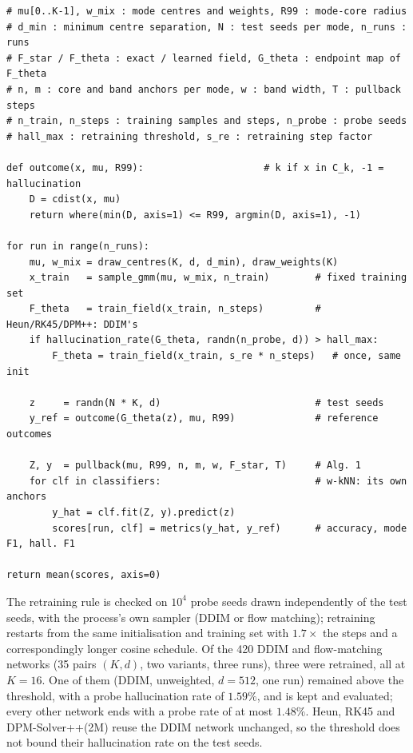 

\begin{algorithm}[htbp]
\caption{Evaluation protocol for one configuration (sampler, mixture variant, $K$, $d$, $T$, $b$).}
\label{alg:app-protocol}
\begin{lstlisting}[style=appcode]
# mu[0..K-1], w_mix : mode centres and weights, R99 : mode-core radius
# d_min : minimum centre separation, N : test seeds per mode, n_runs : runs
# F_star / F_theta : exact / learned field, G_theta : endpoint map of F_theta
# n, m : core and band anchors per mode, w : band width, T : pullback steps
# n_train, n_steps : training samples and steps, n_probe : probe seeds
# hall_max : retraining threshold, s_re : retraining step factor

def outcome(x, mu, R99):                     # k if x in C_k, -1 = hallucination
    D = cdist(x, mu)
    return where(min(D, axis=1) <= R99, argmin(D, axis=1), -1)

for run in range(n_runs):
    mu, w_mix = draw_centres(K, d, d_min), draw_weights(K)
    x_train   = sample_gmm(mu, w_mix, n_train)        # fixed training set
    F_theta   = train_field(x_train, n_steps)         # Heun/RK45/DPM++: DDIM's
    if hallucination_rate(G_theta, randn(n_probe, d)) > hall_max:
        F_theta = train_field(x_train, s_re * n_steps)   # once, same init

    z     = randn(N * K, d)                           # test seeds
    y_ref = outcome(G_theta(z), mu, R99)              # reference outcomes

    Z, y  = pullback(mu, R99, n, m, w, F_star, T)     # Alg. 1
    for clf in classifiers:                           # w-kNN: its own anchors
        y_hat = clf.fit(Z, y).predict(z)
        scores[run, clf] = metrics(y_hat, y_ref)      # accuracy, mode F1, hall. F1

return mean(scores, axis=0)
\end{lstlisting}
\end{algorithm}

The retraining rule is checked on $10^4$ probe seeds drawn independently of the test seeds, with
the process's own sampler (DDIM or flow matching); retraining restarts from the same initialisation
and training set with $1.7\times$ the steps and a correspondingly longer cosine schedule. Of the
420 DDIM and flow-matching networks (35 pairs $(K, d)$, two variants, three runs), three were
retrained, all at $K = 16$. One of them (DDIM, unweighted, $d = 512$, one run) remained above the
threshold, with a probe hallucination rate of $1.59\%$, and is kept and evaluated; every other
network ends with a probe rate of at most $1.48\%$. Heun, RK45 and DPM-Solver++(2M) reuse the DDIM
network unchanged, so the threshold does not bound their hallucination rate on the test seeds.

